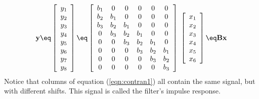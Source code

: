 \begin{equation}
\bold y \eq
\left[ 
\begin{array}{c}
  y_1 \\ 
  y_2 \\ 
  y_3 \\ 
  y_4 \\ 
  y_5 \\ 
  y_6 \\ 
  y_7 \\ 
  y_8
  \end{array} \right] 
\eq
\left[ 
\begin{array}{cccccc}
  b_1 & 0   & 0    & 0   & 0   & 0   \\
  b_2 & b_1 & 0    & 0   & 0   & 0   \\
  b_3 & b_2 & b_1  & 0   & 0   & 0   \\
  0   & b_3 & b_2  & b_1 & 0   & 0   \\
  0   & 0   & b_3  & b_2 & b_1 & 0   \\
  0   & 0   & 0    & b_3 & b_2 & b_1 \\
  0   & 0   & 0    & 0   & b_3 & b_2 \\
  0   & 0   & 0    & 0   & 0   & b_3 
  \end{array} \right] 
\; \left[ 
\begin{array}{c}
  x_1 \\ 
  x_2 \\ 
  x_3 \\ 
  x_4 \\ 
  x_5 \\ 
  x_6
  \end{array} \right]
\eq \bold B \bold x
\label{eqn:contran1}
\end{equation}
Notice that columns of
equation (\ref{eqn:contran1})
all contain the same signal,
but with different shifts.
This signal is called the filter's impulse response.


